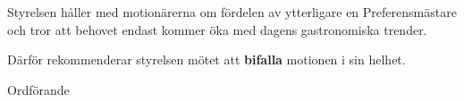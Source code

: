 \documentclass[../_main/handlingar.tex]{subfiles}
\begin{document}
\motionssvar

Styrelsen håller med motionärerna om fördelen av ytterligare en Preferensmästare och tror att behovet endast kommer öka med dagens gastronomiska trender.

Därför rekommenderar styrelsen mötet att \textbf{bifalla} motionen i sin helhet.


\begin{signatures}{1}
    \ist
    \signature{\ordf}{Ordförande}
\end{signatures}
\end{document}
